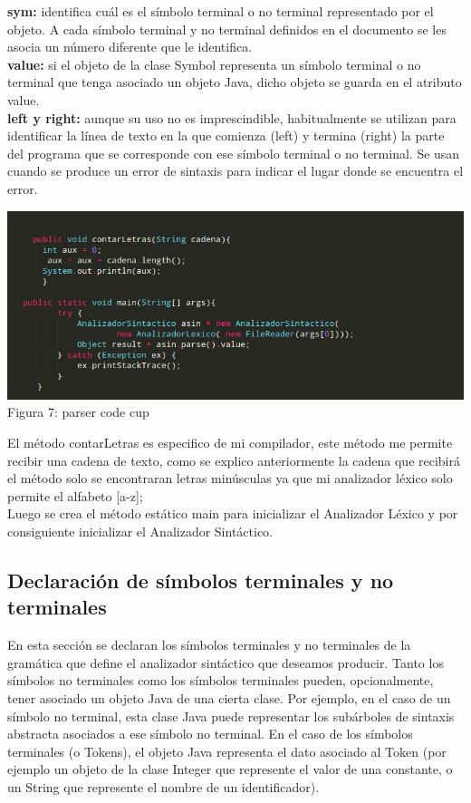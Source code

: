 \documentclass[a4paper,openright,12pt]{article}
\begin{document}
\textbf{sym: } identifica cuál es el símbolo terminal o no terminal representado por el objeto. A cada símbolo terminal y no terminal definidos en el documento se les asocia un número diferente que le identifica.\\

\textbf{value: } si el objeto de la clase Symbol representa un símbolo terminal o no terminal que tenga asociado un objeto Java, dicho objeto se guarda en el atributo value.\\

\textbf{left y right: } aunque su uso no es imprescindible, habitualmente se utilizan para identificar la línea de texto en la que comienza (left) y termina (right) la parte del programa que se corresponde con ese símbolo terminal o no terminal. Se usan cuando se produce un error de sintaxis para indicar el lugar donde se encuentra el error.

\begin{center}
\includegraphics[height=0.3\textheight]{parser2.png}
\\
Figura 7: parser code cup
\end{center}

El método contarLetras es especifico de mi compilador, este método
me permite recibir una cadena de texto, como se explico anteriormente
la cadena que recibirá el método solo se encontraran letras minúsculas
ya que mi analizador léxico solo permite el alfabeto [a-z];\\

Luego se crea el método estático main para inicializar el Analizador
Léxico y por consiguiente inicializar el Analizador Sintáctico.


\subsection{Declaración de símbolos terminales y no terminales}

En esta sección se declaran los símbolos terminales y no terminales de la gramática que define el analizador sintáctico que deseamos producir. Tanto los símbolos no terminales como los símbolos terminales pueden, opcionalmente, tener asociado un objeto Java de una cierta clase. Por ejemplo, en el caso de un símbolo no terminal, esta clase Java puede representar los subárboles de sintaxis abstracta asociados a ese símbolo no terminal. En el caso de los símbolos terminales (o Tokens), el objeto Java representa el dato asociado al Token (por ejemplo un objeto de la clase Integer que represente el valor de una constante, o un String que represente el nombre de un identificador).\cite{2}
\end{document}

